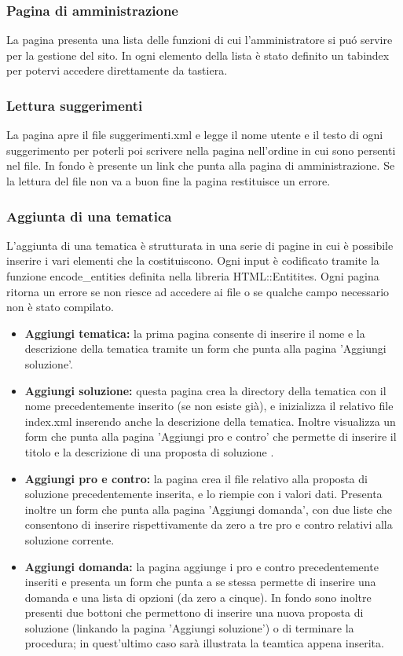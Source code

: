 \documentclass[a4paper,10pt]{article}
\begin{document}
\subsubsection{Pagina di amministrazione}
La pagina presenta una lista delle funzioni di cui l'amministratore si pu\'o servire per la gestione del sito. In ogni elemento della lista \`e stato definito un tabindex per potervi accedere direttamente da tastiera. 

\subsubsection{Lettura suggerimenti}
La pagina apre il file suggerimenti.xml e legge il nome utente e il testo di ogni suggerimento per poterli poi scrivere nella pagina nell'ordine in cui sono persenti nel file. In fondo \`e presente un link che punta alla pagina di amministrazione. Se la lettura del file non va a buon fine la pagina restituisce un errore.

\subsubsection{Aggiunta di una tematica}
L'aggiunta di una tematica \`e strutturata in una serie di pagine in cui \`e possibile inserire i vari elementi che la costituiscono. Ogni input \`e codificato tramite la funzione encode{\_}entities definita nella libreria HTML::Entitites. Ogni pagina ritorna un errore se non riesce ad accedere ai file o se qualche campo necessario non \`e stato compilato.
\begin{itemize}
\item \textbf{Aggiungi tematica:} la prima pagina consente di inserire il nome e la descrizione della tematica tramite un form che punta alla pagina 'Aggiungi soluzione'.
\item \textbf{Aggiungi soluzione:} questa pagina crea la directory della tematica con il nome precedentemente inserito (se non esiste gi\`a), e inizializza il relativo file index.xml inserendo anche la descrizione della tematica. Inoltre visualizza un form che punta alla pagina 'Aggiungi pro e contro' che permette di inserire il titolo e la descrizione di una proposta di soluzione .
\item \textbf{Aggiungi pro e contro:} la pagina crea il file relativo alla proposta di soluzione precedentemente inserita, e lo riempie con i valori dati. Presenta inoltre un form che punta alla pagina 'Aggiungi domanda', con due liste che consentono di inserire rispettivamente da zero a tre pro e contro relativi alla soluzione corrente. 
\item \textbf{Aggiungi domanda:} la pagina aggiunge i pro e contro precedentemente inseriti e presenta un form che punta a se stessa permette di inserire una domanda e una lista di opzioni (da zero a cinque). In fondo sono inoltre presenti due bottoni che permettono di inserire una nuova proposta di soluzione (linkando la pagina 'Aggiungi soluzione') o di terminare la procedura; in quest'ultimo caso sar\`a illustrata la teamtica appena inserita.
\end{itemize}
\end{document}
